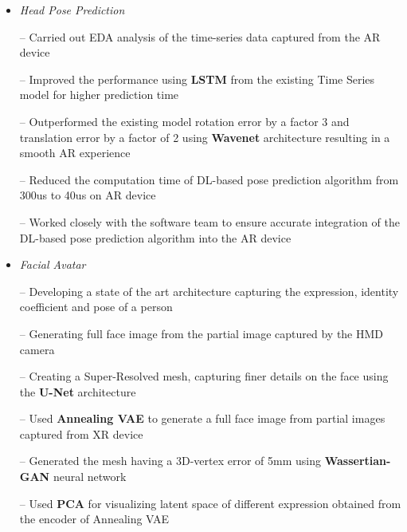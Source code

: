 \documentclass{article}
\begin{document}
\begin{itemize}
\setlength{\itemsep} {-0.2em}
 \item\textit{Head Pose Prediction}
 \item[--] Carried out EDA analysis of the time-series data captured from the AR device

\item[--] Improved the performance  using \textbf{LSTM} from the existing Time Series model for higher prediction time
\item[--] Outperformed the existing model rotation error by a factor 3 and translation error by a factor of 2 using \textbf{Wavenet} architecture
resulting in a smooth AR experience
\item[--] Reduced the computation time of  DL-based pose prediction algorithm  from 300us to 40us on AR device  
\item[--] Worked closely with the software team to ensure accurate integration of the DL-based pose prediction algorithm into the AR device
 \item\textit{Facial Avatar}
   \item[--] Developing a state of the art architecture capturing  the expression, identity coefficient and pose of a person
   \item[--] Generating full face image from the partial image captured by the HMD camera
   \item[--] Creating a Super-Resolved mesh, capturing finer details on the face using the \textbf{U-Net} architecture
  \item[--] Used \textbf{Annealing VAE}  to generate a full face image from partial images captured from XR device  
   \item[--] Generated the mesh having a 3D-vertex error of 5mm
   using \textbf{Wassertian-GAN} neural network
   \item[--] Used \textbf{PCA} for visualizing latent space of different expression obtained from the encoder of Annealing VAE
   
   
\end{itemize}
\end{document}
